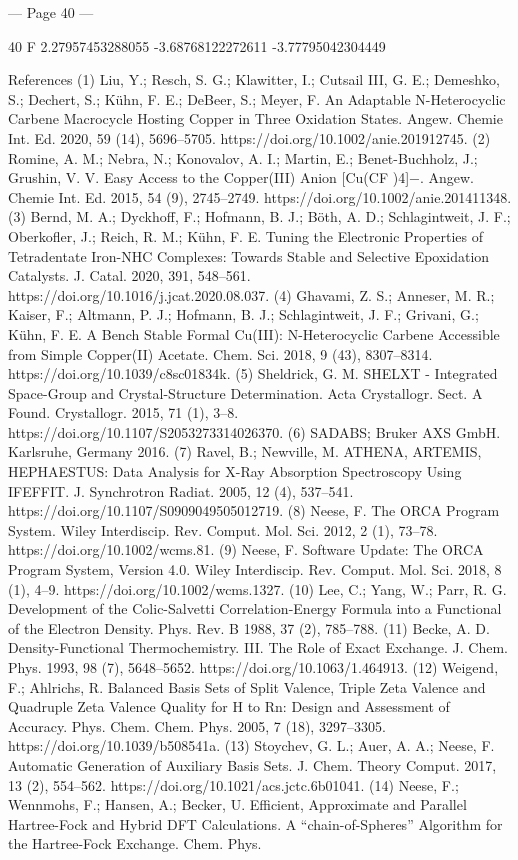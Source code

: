 --- Page 40 ---
 
40 
  F   2.27957453288055     -3.68768122272611     -3.77795042304449 
 
References  
(1)  
Liu, Y.; Resch, S. G.; Klawitter, I.; Cutsail III, G. E.; Demeshko, S.; Dechert, S.; Kühn, F. E.; DeBeer, S.; 
Meyer, F. An Adaptable N-Heterocyclic Carbene Macrocycle Hosting Copper in Three Oxidation States. 
Angew. Chemie Int. Ed. 2020, 59 (14), 5696–5705. https://doi.org/10.1002/anie.201912745. 
(2)  
Romine, A. M.; Nebra, N.; Konovalov, A. I.; Martin, E.; Benet-Buchholz, J.; Grushin, V. V. Easy Access to 
the Copper(III) Anion [Cu(CF )4]−. Angew. Chemie Int. Ed. 2015, 54 (9), 2745–2749. 
https://doi.org/10.1002/anie.201411348. 
(3)  
Bernd, M. A.; Dyckhoff, F.; Hofmann, B. J.; Böth, A. D.; Schlagintweit, J. F.; Oberkofler, J.; Reich, R. M.; 
Kühn, F. E. Tuning the Electronic Properties of Tetradentate Iron-NHC Complexes: Towards Stable and 
Selective Epoxidation Catalysts. J. Catal. 2020, 391, 548–561. https://doi.org/10.1016/j.jcat.2020.08.037. 
(4)  
Ghavami, Z. S.; Anneser, M. R.; Kaiser, F.; Altmann, P. J.; Hofmann, B. J.; Schlagintweit, J. F.; Grivani, 
G.; Kühn, F. E. A Bench Stable Formal Cu(III): N-Heterocyclic Carbene Accessible from Simple Copper(II) 
Acetate. Chem. Sci. 2018, 9 (43), 8307–8314. https://doi.org/10.1039/c8sc01834k. 
(5)  
Sheldrick, G. M. SHELXT - Integrated Space-Group and Crystal-Structure Determination. Acta 
Crystallogr. Sect. A Found. Crystallogr. 2015, 71 (1), 3–8. https://doi.org/10.1107/S2053273314026370. 
(6)  
SADABS; Bruker AXS GmbH. Karlsruhe, Germany 2016. 
(7)  
Ravel, B.; Newville, M. ATHENA, ARTEMIS, HEPHAESTUS: Data Analysis for X-Ray Absorption 
Spectroscopy 
Using 
IFEFFIT. 
J. 
Synchrotron 
Radiat. 
2005, 
12 
(4), 
537–541. 
https://doi.org/10.1107/S0909049505012719. 
(8)  
Neese, F. The ORCA Program System. Wiley Interdiscip. Rev. Comput. Mol. Sci. 2012, 2 (1), 73–78. 
https://doi.org/10.1002/wcms.81. 
(9)  
Neese, F. Software Update: The ORCA Program System, Version 4.0. Wiley Interdiscip. Rev. Comput. 
Mol. Sci. 2018, 8 (1), 4–9. https://doi.org/10.1002/wcms.1327. 
(10)  
Lee, C.; Yang, W.; Parr, R. G. Development of the Colic-Salvetti Correlation-Energy Formula into a 
Functional of the Electron Density. Phys. Rev. B 1988, 37 (2), 785–788. 
(11)  
Becke, A. D. Density-Functional Thermochemistry. III. The Role of Exact Exchange. J. Chem. Phys. 1993, 
98 (7), 5648–5652. https://doi.org/10.1063/1.464913. 
(12)  
Weigend, F.; Ahlrichs, R. Balanced Basis Sets of Split Valence, Triple Zeta Valence and Quadruple Zeta 
Valence Quality for H to Rn: Design and Assessment of Accuracy. Phys. Chem. Chem. Phys. 2005, 7 
(18), 3297–3305. https://doi.org/10.1039/b508541a. 
(13)  
Stoychev, G. L.; Auer, A. A.; Neese, F. Automatic Generation of Auxiliary Basis Sets. J. Chem. Theory 
Comput. 2017, 13 (2), 554–562. https://doi.org/10.1021/acs.jctc.6b01041. 
(14)  
Neese, F.; Wennmohs, F.; Hansen, A.; Becker, U. Efficient, Approximate and Parallel Hartree-Fock and 
Hybrid DFT Calculations. A “chain-of-Spheres” Algorithm for the Hartree-Fock Exchange. Chem. Phys. 



